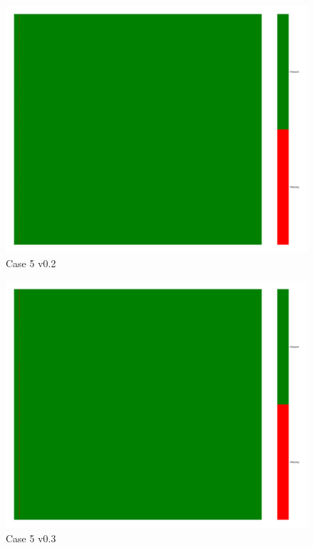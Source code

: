 \documentclass[a4paper,12pt]{article}
\begin{document}
\begin{figure}[H]
    \includegraphics[width=\linewidth]{case5_v0.2_heatmap_cleaned.png}
    \caption*{Case 5 v0.2}
\end{figure}

\begin{figure}[H]
    \includegraphics[width=\linewidth]{case5_v0.3_heatmap_cleaned.png}
    \caption*{Case 5 v0.3}
\end{figure}
\end{document}
